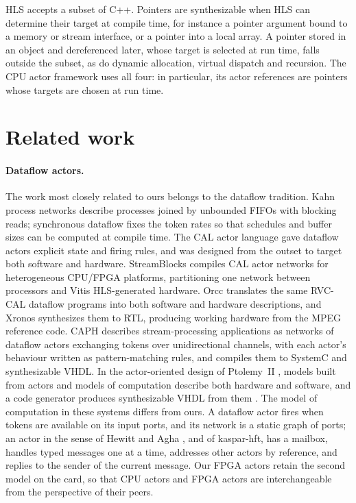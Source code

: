 \documentclass[11pt]{article}
\begin{document}
HLS accepts a subset of C++. Pointers are synthesizable when HLS can determine
their target at compile time, for instance a pointer argument bound to a memory
or stream interface, or a pointer into a local array. A pointer stored in an
object and dereferenced later, whose target is selected at run time, falls
outside the subset, as do dynamic allocation, virtual dispatch and recursion.
The CPU actor framework uses all four: in particular, its actor references are
pointers whose targets are chosen at run time.

\section{Related work}
\label{sec:related}

\paragraph{Dataflow actors.} The work most closely related to ours belongs to
the dataflow tradition. Kahn process networks \cite{kahn1974} describe processes
joined by unbounded FIFOs with blocking reads; synchronous dataflow
\cite{lee1987sdf} fixes the token rates so that schedules and buffer sizes can
be computed at compile time. The CAL actor language \cite{cal2003} gave
dataflow actors explicit state and firing rules, and was designed from the
outset to target both software and hardware. StreamBlocks
\cite{streamblocks2020,streamblocks2021} compiles CAL actor networks for
heterogeneous CPU/FPGA platforms, partitioning one network between processors
and Vitis HLS-generated hardware. Orcc \cite{orcc2013} translates the same
RVC-CAL dataflow programs into both software and hardware descriptions, and
Xronos \cite{xronos2013} synthesizes them to RTL, producing working hardware
from the MPEG reference code. CAPH \cite{caph2011} describes stream-processing
applications as networks of dataflow actors exchanging tokens over
unidirectional channels, with each actor's behaviour written as pattern-matching
rules, and compiles them to SystemC and synthesizable VHDL. In the actor-oriented
design of Ptolemy~II \cite{lee2003actororiented}, models built from actors and
models of computation describe both hardware and software, and a code generator
produces synthesizable VHDL from them \cite{ptolemyvhdl2008}. The model of
computation in these systems differs from ours.
A dataflow actor fires when tokens are available on its input ports, and its
network is a static graph of ports; an actor in the sense of Hewitt and Agha
\cite{hewitt1973,agha1986}, and of kaspar-hft, has a mailbox, handles typed
messages one at a time, addresses other actors by reference, and replies to the
sender of the current message. Our FPGA actors retain the second model on the
card, so that CPU actors and FPGA actors are interchangeable from the
perspective of their peers.
\end{document}
